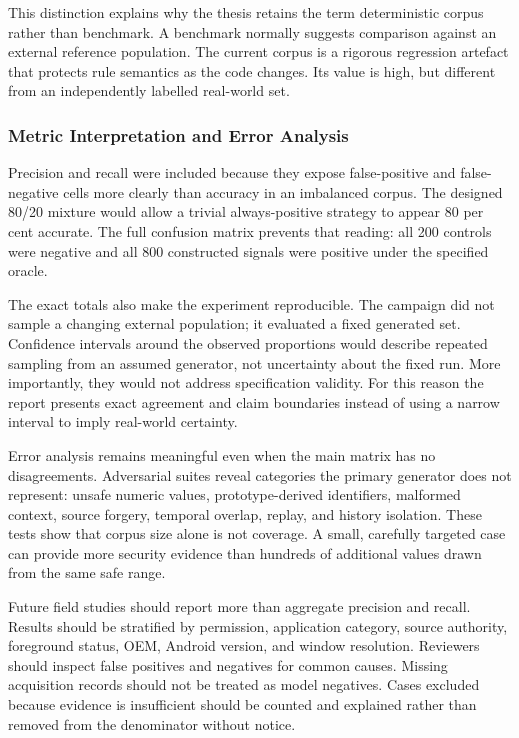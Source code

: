This distinction explains why the thesis retains the term deterministic corpus rather than benchmark. A benchmark normally suggests comparison against an external reference population. The current corpus is a rigorous regression artefact that protects rule semantics as the code changes. Its value is high, but different from an independently labelled real-world set.

\subsubsection{Metric Interpretation and Error Analysis}

Precision and recall were included because they expose false-positive and false-negative cells more clearly than accuracy in an imbalanced corpus. The designed 80/20 mixture would allow a trivial always-positive strategy to appear 80 per cent accurate. The full confusion matrix prevents that reading: all 200 controls were negative and all 800 constructed signals were positive under the specified oracle.

The exact totals also make the experiment reproducible. The campaign did not sample a changing external population; it evaluated a fixed generated set. Confidence intervals around the observed proportions would describe repeated sampling from an assumed generator, not uncertainty about the fixed run. More importantly, they would not address specification validity. For this reason the report presents exact agreement and claim boundaries instead of using a narrow interval to imply real-world certainty.

Error analysis remains meaningful even when the main matrix has no disagreements. Adversarial suites reveal categories the primary generator does not represent: unsafe numeric values, prototype-derived identifiers, malformed context, source forgery, temporal overlap, replay, and history isolation. These tests show that corpus size alone is not coverage. A small, carefully targeted case can provide more security evidence than hundreds of additional values drawn from the same safe range.

Future field studies should report more than aggregate precision and recall. Results should be stratified by permission, application category, source authority, foreground status, OEM, Android version, and window resolution. Reviewers should inspect false positives and negatives for common causes. Missing acquisition records should not be treated as model negatives. Cases excluded because evidence is insufficient should be counted and explained rather than removed from the denominator without notice.

